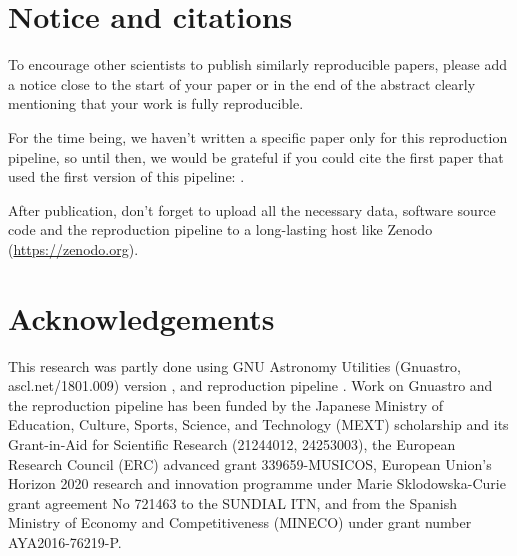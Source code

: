 \documentclass[10pt, twocolumn]{article}
\begin{document}
\section{Notice and citations}
To encourage other scientists to publish similarly reproducible papers,
please add a notice close to the start of your paper or in the end of the
abstract clearly mentioning that your work is fully reproducible.

For the time being, we haven't written a specific paper only for this
reproduction pipeline, so until then, we would be grateful if you could
cite the first paper that used the first version of this pipeline:
\citet{ai15}.

After publication, don't forget to upload all the necessary data, software
source code and the reproduction pipeline to a long-lasting host like
Zenodo (\url{https://zenodo.org}).





\section{Acknowledgements}

This research was partly done using GNU Astronomy Utilities (Gnuastro,
ascl.net/1801.009) version \gnuastroversion, and reproduction pipeline
\pipelineversion. Work on Gnuastro and the reproduction pipeline has been
funded by the Japanese Ministry of Education, Culture, Sports, Science, and
Technology (MEXT) scholarship and its Grant-in-Aid for Scientific Research
(21244012, 24253003), the European Research Council (ERC) advanced grant
339659-MUSICOS, European Union’s Horizon 2020 research and innovation
programme under Marie Sklodowska-Curie grant agreement No 721463 to the
SUNDIAL ITN, and from the Spanish Ministry of Economy and Competitiveness
(MINECO) under grant number AYA2016-76219-P.
\end{document}
